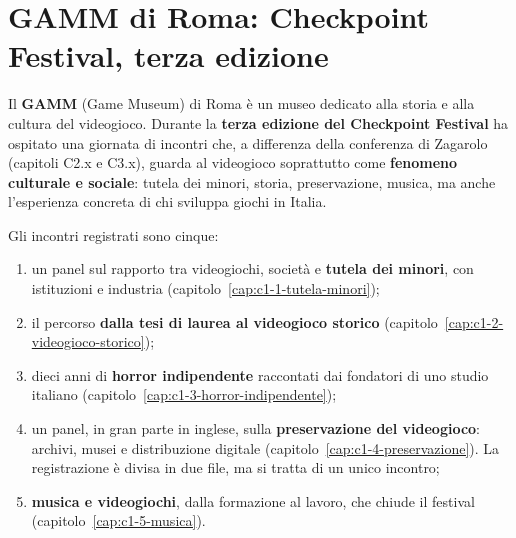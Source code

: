 
\chapter*{GAMM di Roma: Checkpoint Festival, terza edizione}
{}

Il \textbf{GAMM} (Game Museum) di Roma è un museo dedicato alla storia e alla
cultura del videogioco. Durante la \textbf{terza edizione del Checkpoint Festival}
ha ospitato una giornata di incontri che, a differenza della conferenza di Zagarolo
(capitoli C2.x e C3.x), guarda al videogioco soprattutto come \textbf{fenomeno
culturale e sociale}: tutela dei minori, storia, preservazione, musica, ma anche
l'esperienza concreta di chi sviluppa giochi in Italia.

Gli incontri registrati sono cinque:
\begin{enumerate}
  \item un panel sul rapporto tra videogiochi, società e \textbf{tutela dei minori},
        con istituzioni e industria (capitolo~\ref{cap:c1-1-tutela-minori});
  \item il percorso \textbf{dalla tesi di laurea al videogioco storico}
        (capitolo~\ref{cap:c1-2-videogioco-storico});
  \item dieci anni di \textbf{horror indipendente} raccontati dai fondatori di uno
        studio italiano (capitolo~\ref{cap:c1-3-horror-indipendente});
  \item un panel, in gran parte in inglese, sulla \textbf{preservazione del
        videogioco}: archivi, musei e distribuzione digitale
        (capitolo~\ref{cap:c1-4-preservazione}). La registrazione è divisa in due
        file, ma si tratta di un unico incontro;
  \item \textbf{musica e videogiochi}, dalla formazione al lavoro, che chiude il
        festival (capitolo~\ref{cap:c1-5-musica}).
\end{enumerate}
